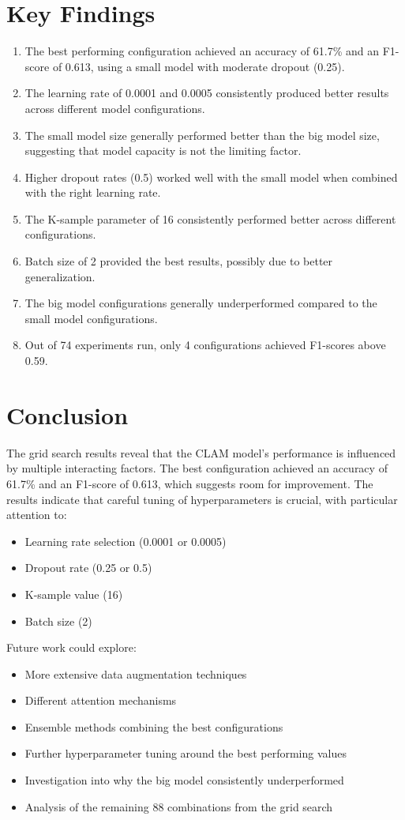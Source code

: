 \documentclass{article}
\begin{document}
\section{Key Findings}
\begin{enumerate}
    \item The best performing configuration achieved an accuracy of 61.7\% and an F1-score of 0.613, using a small model with moderate dropout (0.25).
    \item The learning rate of 0.0001 and 0.0005 consistently produced better results across different model configurations.
    \item The small model size generally performed better than the big model size, suggesting that model capacity is not the limiting factor.
    \item Higher dropout rates (0.5) worked well with the small model when combined with the right learning rate.
    \item The K-sample parameter of 16 consistently performed better across different configurations.
    \item Batch size of 2 provided the best results, possibly due to better generalization.
    \item The big model configurations generally underperformed compared to the small model configurations.
    \item Out of 74 experiments run, only 4 configurations achieved F1-scores above 0.59.
\end{enumerate}

\section{Conclusion}
The grid search results reveal that the CLAM model's performance is influenced by multiple interacting factors. The best configuration achieved an accuracy of 61.7\% and an F1-score of 0.613, which suggests room for improvement. The results indicate that careful tuning of hyperparameters is crucial, with particular attention to:

\begin{itemize}
    \item Learning rate selection (0.0001 or 0.0005)
    \item Dropout rate (0.25 or 0.5)
    \item K-sample value (16)
    \item Batch size (2)
\end{itemize}

Future work could explore:
\begin{itemize}
    \item More extensive data augmentation techniques
    \item Different attention mechanisms
    \item Ensemble methods combining the best configurations
    \item Further hyperparameter tuning around the best performing values
    \item Investigation into why the big model consistently underperformed
    \item Analysis of the remaining 88 combinations from the grid search
\end{itemize}
\end{document}
